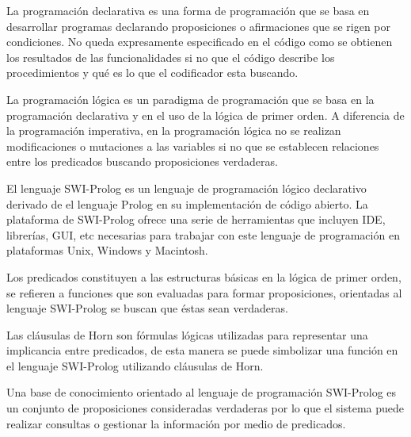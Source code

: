 \documentclass[letterpaper,12pt]{report}
\begin{document}
\begin{description}[align=left]

\item [Programación declarativa:]
    La programación declarativa es una forma de programación que se basa en desarrollar programas declarando proposiciones o afirmaciones que se rigen por condiciones. No queda expresamente especificado en el código como se obtienen los resultados de las funcionalidades si no que el código describe los procedimientos y qué es lo que el codificador esta buscando.

\item [Programación lógica:] 
    La programación lógica es un paradigma de programación que se basa en la programación declarativa y en el uso de la lógica de primer orden. A diferencia de la programación imperativa, en la programación lógica no se realizan modificaciones o mutaciones a las variables si no que se establecen relaciones entre los predicados buscando proposiciones verdaderas.

\item [Lenguaje de programación SWI-Prolog:]
    El lenguaje SWI-Prolog es un lenguaje de programación lógico declarativo derivado de el lenguaje Prolog en su implementación de código abierto. La plataforma de SWI-Prolog ofrece una serie de herramientas que incluyen IDE, librerías, GUI, etc necesarias para trabajar con este lenguaje de programación en plataformas Unix, Windows y Macintosh.

\item [Predicados:]
    Los predicados constituyen a las estructuras básicas en la lógica de primer orden, se refieren a funciones que son evaluadas para formar proposiciones, orientadas al lenguaje SWI-Prolog se buscan que éstas sean verdaderas.

\item [Cláusulas de Horn:]
    Las cláusulas de Horn son fórmulas lógicas utilizadas para representar una implicancia entre predicados, de esta manera se puede simbolizar una función en el lenguaje SWI-Prolog utilizando cláusulas de Horn.

\item [Base de conocimientos:]
    Una base de conocimiento orientado al lenguaje de programación SWI-Prolog es un conjunto de proposiciones consideradas verdaderas por lo que el sistema puede realizar consultas o gestionar la información por medio de predicados. 

\end{description}
\end{document}
